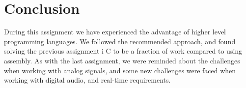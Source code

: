 \section{Conclusion}
During this assignment we have experienced the advantage of higher level programming languages. We followed the recommended approach, and found solving the previous assignment i C to be a fraction of work compared to using assembly. As with the last assignment, we were reminded about the challenges when working with analog signals, and some new challenges were faced when working with digital audio, and real-time requirements.\\